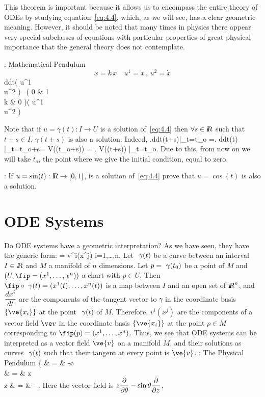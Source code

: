 This theorem is important because it allows us to encompass the entire theory
of ODEs by studying equation~\ref{eq:4.4}, 
which, as we will see, has a clear geometric meaning. 
However, it should be noted that many times in physics
there appear very special subclasses of equations with particular properties
of great physical importance that the general theory does not contemplate.

\ejem: Mathematical Pendulum
$$ \ddot x=k\,x \,\,\,\,\,\,u^1=x\,,\,u^2=\dot x$$
\beq \frac d{dt}\left(
                 u^1 \\ u^2
                 \earr \right)=\left(
                                0 & 1\\
                                k & 0
                                \earr\right)\left(
                                              u^1 \\ u^2
                                              \earr\right)
\eeq 

\espa
Note that if $u = \gamma(t): I \rightarrow U $ is a solution of~\ref{eq:4.4}
then $\forall s\in \mbox{\sl {l$\!\!\!\;\:\!$R}} $ such that $t+s \in I$, $\gamma(t+s)$ is also
a solution. Indeed,
\beq
\left.\frac d{dt}\gamma(t+s)\right|_{t=t_o} =\left. \frac d{dt}\gamma(t) 
\right|_{t=t_o+s}= V(\gamma(t_o+s)) = \left. V(\gamma(t+s)) \right|_{t=t_o}.
\eeq
Due to this, from now on we will take $t_o$, the point where we give 
the initial condition, equal to zero.

\ejer:
If $u=\sin(t):\mbox{\sl {l$\!\!\!\;\:\!$R}} \rightarrow [0,1]$, is a solution of~\ref{eq:4.4}
prove that $u=\cos(t)$ is also a solution.



\section{ODE Systems}

Do ODE systems have a geometric interpretation?
As we have seen, they have the generic form:
\beq
{} = v^i(x^j)\;\;\;\;\;\;\;\;\;\;\; i=1,\ldots,n.
\eeq
Let $\mbox{ $\gamma (t)$}$ be a curve between an interval $I\in \mbox{\sl {l$\!\!\!\;\:\!$R}}$ and $M$ a manifold of
$n$ dimensions. Let $p=\mbox{ $\gamma(t_0)$}$ be a point of $M$ and
$(U,\fip=(x^1,\ldots,x^n))$ a chart with $p\in U$. Then
$\fip\circ\gat=(x^1(t) ,\ldots,x^n(t))$ is a map between $I$ and an
open set of $\mbox{\sl {l$\!\!\!\;\:\!$R}}^n$, and $\displaystyle\frac{dx^i}{dt}$ are the components of the
tangent vector to $\gamma$ in the coordinate basis $\{\ve{x_i}\}$ at the point
$\mbox{ $\gamma (t)$}$ of $M$. Therefore, $v^i(x^j)$ are the components of a
vector field $\ve v$ in the coordinate basis $\{\ve{x_i}\}$ at the point
$p\in M$ corresponding to $\fip(p)=(x^1,\ldots,x^n)$. Thus, we see that
ODE systems can be interpreted as a vector field $\ve{v}$ on a manifold $M$, and their solutions as curves $\mbox{ $\gamma (t)$} $ 
such that their tangent at every point is $\ve{v}$. 
\espa
\noi
\ejem: The Physical Pendulum
\beq
\left\{
   \ddot\theta  & = & -\sin\theta \;\;\;\;\mbox{\o} \\
   \dot \theta & = & z  \\
   \dot z & = & -\sin\theta 
   \earr\right.
\eeq
\noi
Here the vector field is $z\displaystyle\frac{\partial}{\partial\theta} -
\sin \theta \displaystyle\frac{\partial}{\partial z}$,

